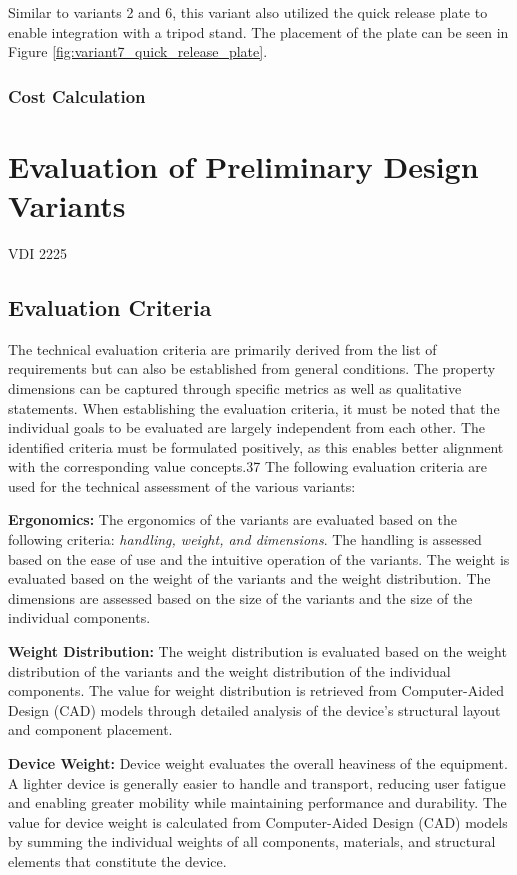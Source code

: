 Similar to variants 2 and 6, this variant also utilized the quick release plate to enable integration with a tripod stand. The placement of the plate can be seen in Figure \ref{fig:variant7_quick_release_plate}.



\subsubsection{Cost Calculation}

\section{Evaluation of Preliminary Design Variants}
VDI 2225

\subsection{Evaluation Criteria}

The technical evaluation criteria are primarily derived from the list of requirements but can also be established from general conditions. The property dimensions can be captured through specific metrics as well as qualitative statements. When establishing the evaluation criteria, it must be noted that the individual goals to be evaluated are largely independent from each other. The identified criteria must be formulated positively, as this enables better alignment with the corresponding value concepts.37 The following evaluation criteria are used for the technical assessment of the various variants:

\textbf{Ergonomics:} The ergonomics of the variants are evaluated based on the following criteria: \textit{handling, weight, and dimensions}. The handling is assessed based on the ease of use and the intuitive operation of the variants. The weight is evaluated based on the weight of the variants and the weight distribution. The dimensions are assessed based on the size of the variants and the size of the individual components.

\textbf{Weight Distribution:} The weight distribution is evaluated based on the weight distribution of the variants and the weight distribution of the individual components. The value for weight distribution is retrieved from Computer-Aided Design (CAD) models through detailed analysis of the device's structural layout and component placement.

\textbf{Device Weight:} Device weight evaluates the overall heaviness of the equipment. A lighter device is generally easier to handle and transport, reducing user fatigue and enabling greater mobility while maintaining performance and durability. The value for device weight is calculated from Computer-Aided Design (CAD) models by summing the individual weights of all components, materials, and structural elements that constitute the device.

